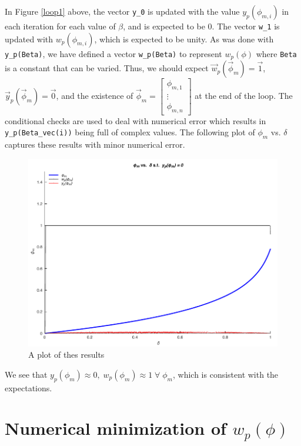 \documentclass[11pt]{article}
\begin{document}
In Figure \ref{loop1} above, the vector \verb|y_0| is updated with the value $y_p(\phi_{m,i})$ in each iteration
for each value of $\beta$, and is expected to be 0. The vector \verb|w_1| is updated with $w_p(\phi_{m,i})$, which is expected to be unity. As was done with \verb|y_p(Beta)|, 
we have defined a vector \verb|w_p(Beta)| to represent $w_p(\phi)$ where \verb|Beta| is a constant that can be varied.
Thus, we should expect $\vec w_p(\vec\phi_m)=\vec{1}$, $\vec y_p(\vec\phi_m)=\vec{0}$, and the existence of $\vec\phi_m=\begin{bmatrix}\phi_{m,1}\\\vdots\\\phi_{m,n}\end{bmatrix}$ at the end of the loop.
The conditional checks are used to deal with numerical error which results in \verb|y_p(Beta_vec(i))| being full of complex values.
The following plot of $\phi_m$ vs. $\delta$ captures these results with minor numerical error.

\begin{figure}[H]
    \centering
    \includegraphics{plots/phi_delta_y.pdf}
    \caption{A plot of thes results}\label{yminplot}
\end{figure}

We see that $y_p(\phi_m)\approx 0,\;w_p(\phi_m)\approx 1\;\forall\;\phi_m$, which is consistent with the expectations. 

\section{Numerical minimization of \texorpdfstring{$w_p(\phi)$}{}}
\end{document}
